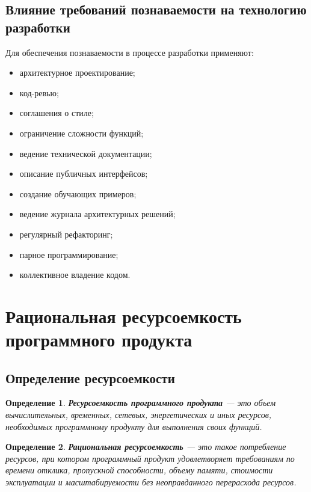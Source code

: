 \documentclass[12pt,a4paper]{article}
\newtheorem{definition}{Определение}
\begin{document}
\subsection{Влияние требований познаваемости на технологию разработки}

Для обеспечения познаваемости в процессе разработки применяют:
\begin{itemize}
    \item архитектурное проектирование;
    \item код-ревью;
    \item соглашения о стиле;
    \item ограничение сложности функций;
    \item ведение технической документации;
    \item описание публичных интерфейсов;
    \item создание обучающих примеров;
    \item ведение журнала архитектурных решений;
    \item регулярный рефакторинг;
    \item парное программирование;
    \item коллективное владение кодом.
\end{itemize}

\section{Рациональная ресурсоемкость программного продукта}

\subsection{Определение ресурсоемкости}

\begin{definition}
\textbf{Ресурсоемкость программного продукта} --- это объем вычислительных, временных, сетевых, энергетических и иных ресурсов, необходимых программному продукту для выполнения своих функций.
\end{definition}

\begin{definition}
\textbf{Рациональная ресурсоемкость} --- это такое потребление ресурсов, при котором программный продукт удовлетворяет требованиям по времени отклика, пропускной способности, объему памяти, стоимости эксплуатации и масштабируемости без неоправданного перерасхода ресурсов.
\end{definition}
\end{document}

